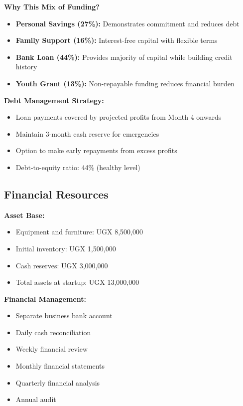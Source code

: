 \documentclass[a4paper,12pt]{article}
\begin{document}
\vspace{1em}

\begin{tcolorbox}[mybox, title=\textbf{Financing Strategy Rationale}]
\textbf{Why This Mix of Funding?}
\begin{itemize}[leftmargin=1em, itemsep=0pt]
    \item \textbf{Personal Savings (27\%):} Demonstrates commitment and reduces debt
    \item \textbf{Family Support (16\%):} Interest-free capital with flexible terms
    \item \textbf{Bank Loan (44\%):} Provides majority of capital while building credit history
    \item \textbf{Youth Grant (13\%):} Non-repayable funding reduces financial burden
\end{itemize}

\textbf{Debt Management Strategy:}
\begin{itemize}[leftmargin=1em, itemsep=0pt]
    \item Loan payments covered by projected profits from Month 4 onwards
    \item Maintain 3-month cash reserve for emergencies
    \item Option to make early repayments from excess profits
    \item Debt-to-equity ratio: 44\% (healthy level)
\end{itemize}
\end{tcolorbox}

\subsection{Financial Resources}

\textbf{Asset Base:}
\begin{itemize}[leftmargin=2em]
    \item Equipment and furniture: UGX 8,500,000
    \item Initial inventory: UGX 1,500,000
    \item Cash reserves: UGX 3,000,000
    \item Total assets at startup: UGX 13,000,000
\end{itemize}

\textbf{Financial Management:}
\begin{itemize}[leftmargin=2em]
    \item Separate business bank account
    \item Daily cash reconciliation
    \item Weekly financial review
    \item Monthly financial statements
    \item Quarterly financial analysis
    \item Annual audit
\end{itemize}
\end{document}
